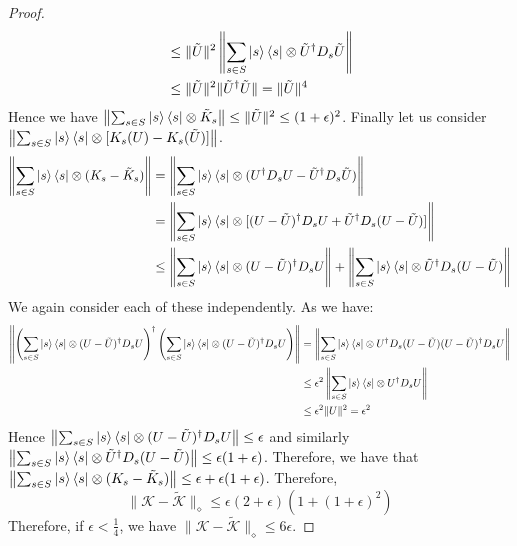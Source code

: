 \documentclass[aps,floatfix,10pt,amssymb,amsfont,amsmath,superscriptaddress,float,nofootinbib,longbibliography,nobalancelastpage,twocolumn]{revtex4-2}
\begin{document}
\begin{widetext}
\begin{proof}
\begin{align}
     &\leq \|\tilde U\|^2\left\|\sum_{s\in S} \ket{s}\bra{s}\otimes\tilde U^{\dagger} D_s  \tilde U\right\|\\
     &\leq \|\tilde U\|^2 \|\tilde U^{\dagger}  \tilde U\|= \|\tilde U\|^4\\
\end{align}
Hence we have $\left\|\sum_{s\in S}\ket{s}\bra{s}\otimes \tilde K_s \right\| \leq \|\tilde U\|^2 \leq (1+\epsilon)^2$. Finally let us consider $\left\|\sum_{s\in S}\ket{s}\bra{s}\otimes[K_s(U)-K_s(\tilde U)]\right\|$.
\begin{align}
    \left\|\sum_{s\in S}\ket{s}\bra{s}\otimes(K_s-\tilde K_s)\right\| &= \left\|\sum_{s\in S}\ket{s}\bra{s}\otimes( U^{\dagger}  D_s U-\tilde U^{\dagger}  D_s \tilde U)\right\|\\
    &= \left\|\sum_{s\in S}\ket{s}\bra{s}\otimes[ (U-\tilde U)^{\dagger}  D_s U+\tilde U^{\dagger}  D_s (U-\tilde U)]\right\|\\
    &\leq \left\|\sum_{s\in S}\ket{s}\bra{s}\otimes (U-\tilde U)^{\dagger}  D_s U\right\|+\left\|\sum_{s\in S}\ket{s}\bra{s}\otimes\tilde U^{\dagger}  D_s (U-\tilde U)\right\|
\end{align}
We again consider each of these independently. As we have:
\begin{align}
   \left\| \left(\sum_{s\in S}\ket{s}\bra{s}\otimes (U-\tilde U)^{\dagger}  D_s U\right)^{\dagger} \left(\sum_{s\in S}\ket{s}\bra{s}\otimes (U-\tilde U)^{\dagger}  D_s U\right)\right\| &= \left\|\sum_{s\in S}\ket{s}\bra{s}\otimes U^{\dagger}D_s (U-\tilde U)(U-\tilde U)^{\dagger}D_s U\right\|\\
    & \leq \epsilon^2\left\|\sum_{s\in S}\ket{s}\bra{s}\otimes U^{\dagger}D_s U\right\|\\
    & \leq \epsilon^2 \|U\|^2 =\epsilon^2  
\end{align}
Hence $\left\|\sum_{s\in S}\ket{s}\bra{s}\otimes (U-\tilde U)^{\dagger}  D_s U\right\| \leq \epsilon $ and similarly $\left\|\sum_{s\in S}\ket{s}\bra{s}\otimes\tilde U^{\dagger}  D_s (U-\tilde U)\right\| \leq \epsilon (1+\epsilon)$. Therefore, we have that $\left\|\sum_{s\in S}\ket{s}\bra{s}\otimes(K_s-\tilde K_s)\right\| \leq \epsilon + \epsilon(1+\epsilon)$. Therefore,
\begin{equation}
    \|\mathcal{K} - \tilde{\mathcal{K}}\|_{\diamond} \leq \epsilon(2+\epsilon)(1+(1+\epsilon)^2)
\end{equation}
Therefore, if $\epsilon < \frac{1}{4}$, we have $\|\mathcal{K} - \tilde {\mathcal{K}}\|_{\diamond} \leq 6\epsilon$.
\end{proof}

\end{widetext}
\end{document}
